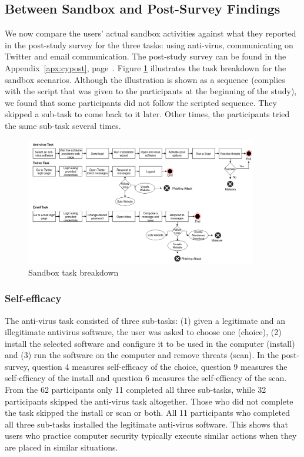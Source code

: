 \subsection{Between Sandbox and Post-Survey Findings}
We now compare the users' actual sandbox activities against what they reported in the post-study survey for the three tasks: using anti-virus, communicating on Twitter and email communication. 
The post-study survey can be found in the Appendix~\ref{apx:cypost}, page~\pageref{apx:cypost}.
Figure \ref{fig:tasks} illustrates the task breakdown for the sandbox scenarios. 
Although the illustration is shown as a sequence (complies with the script that was given to the participants at the beginning of the study), we found that some participants did not follow the scripted sequence. 
They skipped a sub-task to come back to it later. Other times, the participants tried the same sub-task several times.

\begin{figure}[tbp]
  \centering
\includegraphics[width=0.9\textwidth, keepaspectratio=true]{img/tasks.png}
  \caption{Sandbox task breakdown}
  \label{fig:tasks}
\end{figure}

\subsubsection{Self-efficacy}
The anti-virus task consisted of three sub-tasks: (1) given a legitimate and an illegitimate antivirus software, the user was asked to choose one (choice), (2) install the selected software and configure it to be used in the computer (install) and (3) run the software on the computer and remove threats (scan). In the post-survey, question 4 measures self-efficacy of the choice, question 9 measures the self-efficacy of the install and question 6 measures the self-efficacy of the scan. From the 62 participants only 11 completed all three sub-tasks, while 32 participants skipped the anti-virus task altogether. Those who did not complete the task skipped the install or scan or both. All 11 participants who completed all three sub-tasks installed the legitimate anti-virus software. This shows that users who practice computer security typically execute similar actions when they are placed in similar situations.

